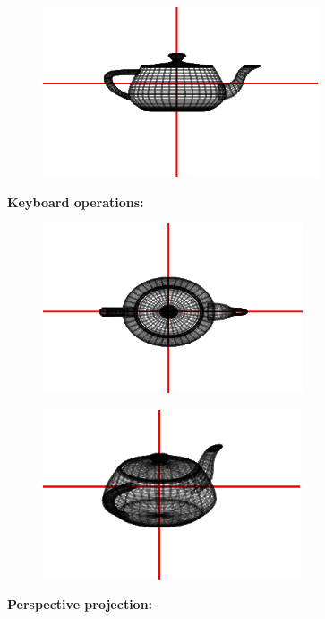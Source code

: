 \documentclass[9pt,letterpaper]{article}
\begin{document}
\begin{figure}[h]
    \centering
    \includegraphics[height=5cm]{Outputs/OP1.png}
\end{figure}
\newpage
\textbf{Keyboard operations: }
\begin{figure}[h]
    \centering
    \includegraphics[height=5cm]{Outputs/OP2.png}
\end{figure}
\begin{figure}[h]
    \centering
    \includegraphics[height=5cm]{Outputs/OP3.png}
\end{figure}

\newpage
\textbf{Perspective projection:}\\
\end{document}
